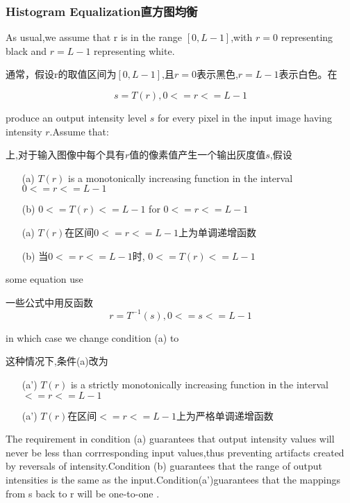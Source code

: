 \documentclass[12pt]{article}
\numberwithin{equation}{section}%
\begin{document}
\subsubsection{Histogram Equalization直方图均衡}

As usual,we assume that r is in the range $[0,L-1]$,with $r=0$ representing black and $r=L-1$ representing white. 

通常，假设r的取值区间为$[0,L-1]$,且$r=0$表示黑色,$r=L-1$表示白色。在

\begin{equation} \label{3.3}   
 s=T(r) ,0<=r<=L-1
\end{equation}

produce an output intensity level $s$ for every pixel in the input image having intensity $r$.Assume that:

上,对于输入图像中每个具有$r$值的像素值产生一个输出灰度值$s$,假设

\begin{enumerate}
\item[(a)] $T(r)$ is a monotonically increasing function in the interval $0<=r<=L-1$
\item[(b)] $0<=T(r)<=L-1$ for $0<=r<=L-1$
\end{enumerate}
\begin{enumerate}
\item[(a)] $T(r)$在区间$0<=r<=L-1$上为单调递增函数
\item[(b)] 当$0<=r<=L-1$时, $0<=T(r)<=L-1$
\end{enumerate}

some equation use

一些公式中用反函数
\begin{equation}  \label{3.4}  %
 r=T^{-1}(s),0<=s<=L-1 
\end{equation}

in which case we change condition (a) to 

这种情况下,条件(a)改为

\begin{enumerate}
\item[(a')] $T(r)$ is a strictly monotonically increasing function in the interval  $<=r<=L-1$
\end{enumerate}

\begin{enumerate}
\item[(a')] $T(r)$在区间$<=r<=L-1$上为严格单调递增函数
\end{enumerate}

The requirement in condition (a) guarantees that output intensity values will never be less than corrresponding input values,thus preventing artifacts created by reversals of intensity.Condition (b) guarantees that the range of output intensities is the same as the input.Condition(a')guarantees that the mappings from s back to r will be one-to-one .
\end{document}
